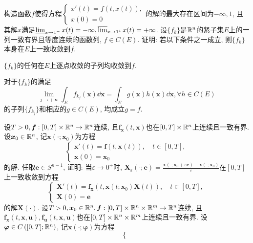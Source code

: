 \begin{quizb}
\woe 构造函数\(f\)使得方程\(\begin{cases}
x'(t)=f\left(t,x(t)\right),\\
x(0)=0
\end{cases}\)的解的最大存在区间为\(-\infty,1\), 且其解\(x\)满足\(\varliminf_{x\rightarrow 1^-}x(t)=-\infty,\varlimsup_{x\rightarrow 1^1}x(t)=+\infty\).
\woe 设\(\{f_k\}\)是\(\mathbb{R}^n\)的紧子集\(E\)上的一列一致有界且等度连续的函数列, \(f\in C(E)\). 证明: 若以下条件之一成立, 则\(\{f_k\}\)本身在\(E\)上一致收敛到\(f\).
\begin{asparaenum}[(i)]
\item \(\{f_k\}\)的任何在\(E\)上逐点收敛的子列均收敛到\(f\).
\item 对于\(\{f_k\}\)的满足\[\lim_{j\rightarrow+\infty}\int_E f_{k_j}\left(\boldsymbol{x}\right)\dd\boldsymbol{x}=\int_Eg\left(\boldsymbol{x}\right)h\left(\boldsymbol{x}\right)\dd\boldsymbol{x},\forall h\in C(E)\]的子列\(\{f_{k_j}\}\)和相应的\(g\in C(E)\), 均成立\(g=f.\)
\end{asparaenum}
\woe 设\(T>0,\boldsymbol{f}:[0,T]\times\mathbb{R}^n\rightarrow\mathbb{R}^n\)连续, 且\(\boldsymbol{f_x}\left(t,\boldsymbol{x}\right)\)也在\([0,T]\times\mathbb{R}^n\)上连续且一致有界. 设\(\boldsymbol{x}_0\in\mathbb{R}^n\), 记\(\boldsymbol{x}(\cdot;\boldsymbol{x}_0)\)为方程\[\begin{cases}
\boldsymbol{x}'(t)=\boldsymbol{f}\left(t,\boldsymbol{x}(t)\right),\quad t\in[0,T],\\
\boldsymbol{x}(0)=\boldsymbol{x}_0
\end{cases}\]的解. 任取\(\boldsymbol{e}\in S^{n-1}\), 证明: 当\(\varepsilon\rightarrow 0^+\)时, \(\boldsymbol{X}_{\varepsilon}(\cdot;\boldsymbol{e})=\frac{\boldsymbol{x}(\cdot;\boldsymbol{x}_0+\varepsilon\boldsymbol{e})-\boldsymbol{x}(\cdot;\boldsymbol{x}_0)}{\varepsilon}\)在\([0,T]\)上一致收敛到方程\[\begin{cases}
\boldsymbol{X}'(t)=\boldsymbol{f_x}\left(t,\boldsymbol{x}\left(t;\boldsymbol{x}_0\right)\boldsymbol{X}(t)\right),\quad t\in[0,T],\\
\boldsymbol{X}(0)=\boldsymbol{e}
\end{cases}\]的解\(\boldsymbol{X}(\cdot)\).
\woe 设\(T>0,\boldsymbol{x}_0\in\mathbb{R}^n,\boldsymbol{f}:[0,T]\times\mathbb{R}^n\times\mathbb{R}^m\rightarrow\mathbb{R}^n\)连续, 且\(\boldsymbol{f_x}\left(t,\boldsymbol{x},\boldsymbol{u}\right),\boldsymbol{f_u}\left(t,\boldsymbol{x},\boldsymbol{u}\right)\)也在\([0,T]\times\mathbb{R}^n\times\mathbb{R}^m\)上连续且一致有界. 设\(\boldsymbol{\varphi}\in C\left([0,T];\mathbb{R}^n\right)\), 记\(\boldsymbol{x}\left(\cdot;\boldsymbol{\varphi}\right)\)为方程\[\begin{cases}

\end{cases}\]
\end{quizb}
